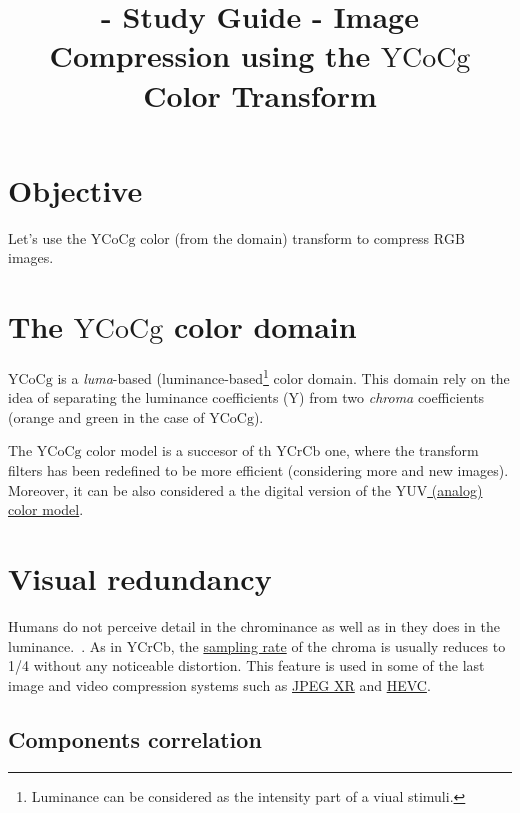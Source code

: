 
 \title{\SM{} - Study Guide - Image
  Compression using the $\text{YCoCg}$ Color Transform}

\maketitle
\tableofcontents

\section{Objective}
Let's use the
\href{https://en.wikipedia.org/wiki/YCbCr}{$\text{YCoCg}$} color (from
the  domain) transform to compress $\text{RGB}$ images.

\section{The $\text{YCoCg}$ color domain}
$\text{YCoCg}$ is a \emph{luma}-based
(luminance-based\footnote{Luminance can be considered as the intensity
part of a viual stimuli.} color domain. This domain rely on the idea
of separating the luminance coefficients (Y) from two \emph{chroma}
coefficients (orange and green in the case of $\text{YCoCg}$).

The $\text{YCoCg}$ color model is a succesor of th $\text{YCrCb}$ one,
where the transform filters has been redefined to be more efficient
(considering more and new images). Moreover, it can be also considered
a the digital version of the
\href{https://en.wikipedia.org/wiki/YUV}{$\text{YUV}$ (analog) color
  model}.

\section{Visual redundancy}

Humans do not perceive detail in the chrominance as well as in they
does in the
luminance.~\cite{vruiz__visual_redundancy,burger2016digital}. As in
$\text{YCrCb}$, the
\href{https://en.wikipedia.org/wiki/Sampling_(signal_processing)}{sampling
  rate} of the chroma is usually reduces to 1/4 without any noticeable
distortion. This feature is used in some of the last image and video
compression systems such as
\href{https://en.wikipedia.org/wiki/JPEG_XR#Description}{JPEG XR} and
\href{https://en.wikipedia.org/wiki/High_Efficiency_Video_Coding#Video_coding_layer}{HEVC}.

\subsection{Components correlation}

